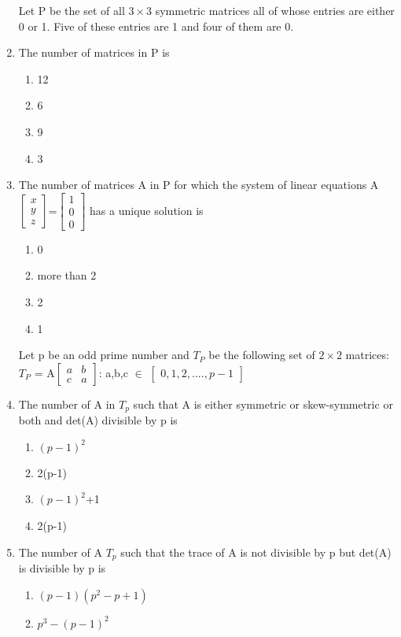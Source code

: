 \begin{enumerate}[label=\arabic*.,ref=\thesubsection.\theenumi]
Let P be the set of all $3\times3$ symmetric matrices all of whose entries are either 0 or 1. Five of these entries are 1 and four of them are 0.
\item The number of matrices in P is
\begin{enumerate}
 \item 12
 \item 6
 \item 9
 \item 3
\end{enumerate}
\item The number of matrices A in P for which the system of linear equations A$\begin{bmatrix} x  \\  y \\ z  \end{bmatrix}$=$\begin{bmatrix} 1  \\  0 \\ 0   \end{bmatrix}$ has a unique solution is 
\begin{enumerate}
 \item 0
 \item more than 2
 \item 2
 \item 1
\end{enumerate}
Let p be an odd prime number and $T_{P}$ be the following set of $2\times2$ matrices:
$T_{P}$ =  A$\begin{bmatrix} a & b \\ c & a \end{bmatrix}$: a,b,c $\in$ $\begin{bmatrix}0,1,2,....,{p-1}\end{bmatrix}$
\item The number of A in $T_p$ such that A is either symmetric or skew-symmetric or both and det(A) divisible by p is 
\begin{enumerate}
 \item $(p-1)^2$
 \item 2(p-1)
 \item $(p-1)^2$+1
 \item 2(p-1)
\end{enumerate}
\item The number of A $T_p$ such that the trace of A is not divisible by p but det(A) is divisible by p is
\begin{enumerate}
 \item $(p-1)(p^2-p+1)$
 \item $p^3-(p-1)^2$

\end{enumerate}
\end{enumerate}
